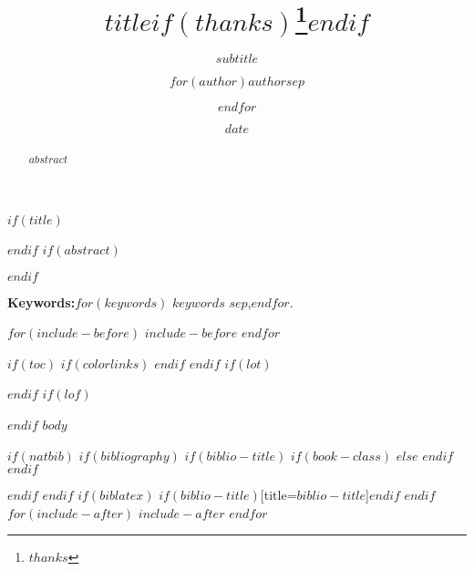 \documentclass[$if(fontsize)$$fontsize$,$endif$$if(lang)$$babel-lang$,$endif$$if(papersize)$$papersize$paper,$endif$$for(classoption)$$classoption$$sep$,$endfor$]{$documentclass$}
\title{$title$$if(thanks)$\thanks{$thanks$}$endif$}
\subtitle{$subtitle$}
\author{$for(author)$$author$$sep$ \and $endfor$}
\institute{$for(institute)$$institute$$sep$ \and $endfor$}
\date{$date$}
\begin{document}
	$if(title)$
		\maketitle
	$endif$
	$if(abstract)$
		\begin{abstract}
			$abstract$
		\end{abstract}
	$endif$
	
	{\bfseries Keywords:}$for(keywords)$ $keywords$ $sep$,$endfor$.

	$for(include-before)$
		$include-before$
	$endfor$

	$if(toc)${
		$if(colorlinks)$
			\hypersetup{linkcolor=$if(toccolor)$$toccolor$$else$black$endif$}
		$endif$
		\setcounter{tocdepth}{$toc-depth$}
		\tableofcontents
	}
	$endif$
	$if(lot)$
		\listoftables
	$endif$
	$if(lof)$
		\listoffigures
	$endif$
	$body$

	$if(natbib)$
	$if(bibliography)$
	$if(biblio-title)$
	$if(book-class)$
		\renewcommand\bibname{$biblio-title$}
	$else$
		\renewcommand\refname{$biblio-title$}
	$endif$
	$endif$
	

	$endif$
	$endif$
	$if(biblatex)$
		\printbibliography$if(biblio-title)$[title=$biblio-title$]$endif$
	$endif$
	$for(include-after)$
		$include-after$
	$endfor$
\end{document}
